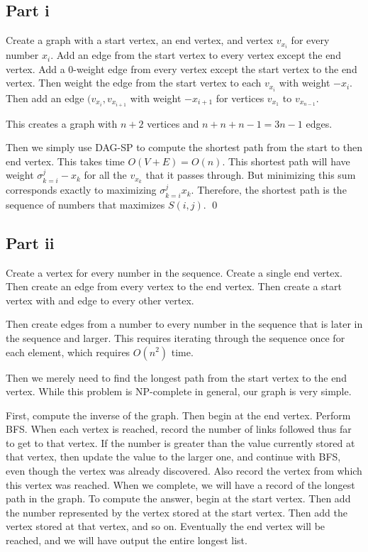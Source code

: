 \documentclass[twoside]{amsart}
\begin{document}
\subsection*{Part i}

Create a graph with a start vertex, an end vertex, and vertex
$v_{x_i}$ for every number $x_i$.  Add an edge from the start vertex
to every vertex except the end vertex.  Add a 0-weight edge from every
vertex except the start vertex to the end vertex.  Then weight the
edge from the start vertex to each $v_{x_i}$ with weight $-x_i$.  Then
add an edge $(v_{x_i}, v_{x_{i+1}}$ with weight $-x_{i+1}$ for vertices
$v_{x_1}$ to $v_{x_{n-1}}$.  

This creates a graph with $n+2$ vertices and $n + n + n-1 = 3n-1$
edges.

Then we simply use DAG-SP to compute the shortest path from the start
to then end vertex.  This takes time $O(V+E) = O(n)$.  This shortest
path will have weight $\sigma_{k=i}^j -x_k$ for all the $v_{x_k}$ that
it passes through.  But minimizing this sum corresponds exactly to
maximizing  $\sigma_{k=i}^j x_k$.  Therefore, the shortest path is the
sequence of numbers that maximizes $S(i,j)$. \qed

\subsection*{Part ii}

Create a vertex for every number in the sequence.  Create a single end
vertex. Then create an edge from every vertex to the end vertex.  Then
create a start vertex with and edge to every other vertex.  

Then create edges from a number to every number in the sequence that
is later in the sequence and larger.  This requires iterating through
the sequence once for each element, which requires $O(n^2)$ time.

Then we merely need to find the longest path from the start vertex to
the end vertex.  While this problem is NP-complete in general, our
graph is very simple. 

First, compute the inverse of the graph.  Then begin at the end
vertex.  Perform BFS.  When each vertex is reached, record the number
of links followed thus far to get to that vertex.  If the number is
greater than the value currently stored at that vertex, then update
the value to the larger one, and continue with BFS, even though the
vertex was already discovered.  Also record the vertex from which this
vertex was reached.  When we complete, we will have a record of the
longest path in the graph.  To compute the answer, begin at the start
vertex.  Then add the number represented by the vertex stored at the
start vertex.  Then add the vertex stored at that vertex, and so on.
Eventually the end vertex will be reached, and we will have output the
entire longest list. 
\end{document}
